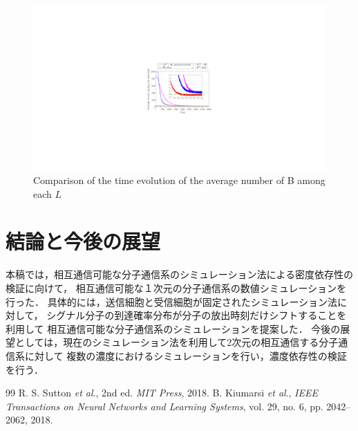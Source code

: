 \documentclass[twocolumn]{jarticle}
\begin{document}
\begin{figure}[tb]
    \centering
    \includegraphics[width=\columnwidth]{figures/step2_cost_fig.pdf}
    \caption{Comparison of the time evolution of the average number of B among each $L$}
    \label{fig:simulation}
\end{figure}


\section{結論と今後の展望}
本稿では，相互通信可能な分子通信系のシミュレーション法による密度依存性の検証に向けて，
相互通信可能な１次元の分子通信系の数値シミュレーションを行った．
具体的には，送信細胞と受信細胞が固定されたシミュレーション法に対して，
シグナル分子の到達確率分布が分子の放出時刻だけシフトすることを利用して
相互通信可能な分子通信系のシミュレーションを提案した．
今後の展望としては，現在のシミュレーション法を利用して2次元の相互通信する分子通信系に対して
複数の濃度におけるシミュレーションを行い，濃度依存性の検証を行う．



\begin{thebibliography} {99}
     R. S. Sutton {\it et al}., %
    2nd ed. { \it MIT Press}, 2018.
     B. Kiumarsi {\it et al}., 
    {\it IEEE Transactions on Neural Networks and Learning Systems}, vol. 29, no. 6, pp. 2042–2062, 2018.
\end{thebibliography}
\end{document}
